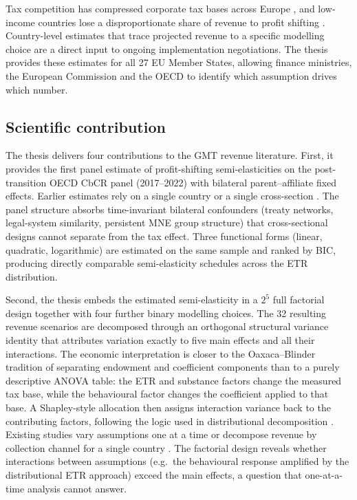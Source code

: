 \documentclass[11pt,a4paper]{article}
\begin{document}
Tax competition has compressed corporate tax bases across Europe \citep{cassee2019}, and low-income countries lose a disproportionate share of revenue to profit shifting \citep{cobham2018,garcia-bernardo2024}. Country-level estimates that trace projected revenue to a specific modelling choice are a direct input to ongoing implementation negotiations. The thesis provides these estimates for all 27 EU Member States, allowing finance ministries, the European Commission and the OECD to identify which assumption drives which number.

\subsection{Scientific contribution}\label{sec:contribution}

The thesis delivers four contributions to the GMT revenue literature. First, it provides the first panel estimate of profit-shifting semi-elasticities on the post-transition OECD CbCR panel (2017--2022) with bilateral parent--affiliate fixed effects. Earlier estimates rely on a single country \citep{dowd2017,boukal2026} or a single cross-section \citep{garcia-bernardo2024}. The panel structure absorbs time-invariant bilateral confounders (treaty networks, legal-system similarity, persistent MNE group structure) that cross-sectional designs cannot separate from the tax effect. Three functional forms (linear, quadratic, logarithmic) are estimated on the same sample and ranked by BIC, producing directly comparable semi-elasticity schedules across the ETR distribution.

Second, the thesis embeds the estimated semi-elasticity in a $2^5$ full factorial design together with four further binary modelling choices. The 32 resulting revenue scenarios are decomposed through an orthogonal structural variance identity that attributes variation exactly to five main effects and all their interactions. The economic interpretation is closer to the Oaxaca--Blinder tradition of separating endowment and coefficient components \citep{oaxaca1973,blinder1973} than to a purely descriptive ANOVA table: the ETR and substance factors change the measured tax base, while the behavioural factor changes the coefficient applied to that base. A Shapley-style allocation then assigns interaction variance back to the contributing factors, following the logic used in distributional decomposition \citep{shorrocks2013}. Existing studies vary assumptions one at a time \citep{barake2022,hugger2026} or decompose revenue by collection channel for a single country \citep{boukal2026}. The factorial design reveals whether interactions between assumptions (e.g.\ the behavioural response amplified by the distributional ETR approach) exceed the main effects, a question that one-at-a-time analysis cannot answer.
\end{document}
